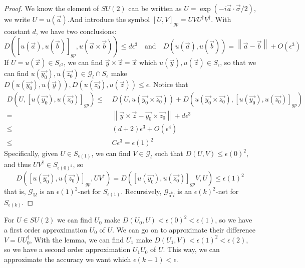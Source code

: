 \documentclass[a4paper,10pt]{book}
\numberwithin{equation}{section}
\begin{document}
\begin{proof}
    We know the element of $SU(2)$ can be written as $U=\exp(-i\vec{a}\cdot\vec{\sigma}/2)$, we write $U=u(\vec{a})$.And introduce the symbol $[U,V]_{gp}=UVU^{\dagger}V^{\dagger}$. With constant $d$, we have two conclusions:
    \begin{equation}
        D([u(\vec{a}),u(\vec{b})]_{gp},u(\vec{a}\times\vec{b}))\leq d\epsilon^{3}\quad\text{and}\quad D(u(\vec{a}),u(\vec{b}))=\left\| \vec{a}-\vec{b} \right\| + O(\epsilon^{3})
    \end{equation}
    If $U=u(\vec{x})\in S_{\epsilon^{2}}$, we can find $\vec{y}\times \vec{z}=\vec{x}$ which $u(\vec{y}),u(\vec{z})\in S_{\epsilon}$, so that we can find $u(\vec{y_{0}}),u(\vec{z_{0}})\in \mathcal{G}_{l}\cap S_{\epsilon}$ make $D(u(\vec{y_{0}}),u(\vec{y})),D(u(\vec{z_{0}}),u(\vec{z}))\leq \epsilon$. Notice that
    \begin{equation}
        \begin{split}
            D(U,[u(\vec{y_{0}}),u(\vec{z_{0}})]_{gp})\leq & \ D(U,u(\vec{y_{0}}\times\vec{z_{0}}))+D(u(\vec{y_{0}}\times\vec{z_{0}}),[u(\vec{y_{0}}),u(\vec{z_{0}})]_{gp}) \\
            =                                             & \  \left\| \vec{y}\times\vec{z}-\vec{y_{0}}\times\vec{z_{0}} \right\|+d\epsilon^{3}                            \\
            \leq                                          & \ (d+2)\epsilon^{3}+O(\epsilon^{4})                                                                            \\
            \leq                                          & \ C\epsilon^{3} = \epsilon(1)^{2}
        \end{split}
    \end{equation}
    Specifically, given $U\in S_{\epsilon(1)}$, we can find $V\in\mathcal{G}_{l}$ such that $D(U,V)\leq \epsilon(0)^{2}$, and thus $UV^{\dagger}\in S_{\epsilon(0)^{2}}$, so
    \begin{equation}
        D([u(\vec{y_{0}}),u(\vec{z_{0}})]_{gp},UV^{\dagger})=D([u(\vec{y_{0}}),u(\vec{z_{0}})]_{gp}V,U)\leq\epsilon(1)^{2}
    \end{equation}
    that is, $\mathcal{G}_{5l}$ is an $\epsilon(1)^{2}$-net for $S_{\epsilon(1)}$. Recursively, $\mathcal{G}_{5^{k}l}$ is an $\epsilon(k)^{2}$-net for $S_{\epsilon(k)}$.
\end{proof}
For $U\in SU(2)$ we can find $U_{0}$ make $D(U_{0},U)<\epsilon(0)^{2}<\epsilon(1)$, so we have a first order approximation $U_{0}$ of $U$. We can go on to approximate their difference $V=UU_{0}^{\dagger}$, With the lemma, we can find $U_{1}$ make $D(U_{1},V)<\epsilon(1)^{2}<\epsilon(2)$, so we have a second order approximation $U_{1}U_{0}$ of $U$. This way, we can approximate the accuracy we want which $\epsilon(k+1)<\epsilon$.
\end{document}
